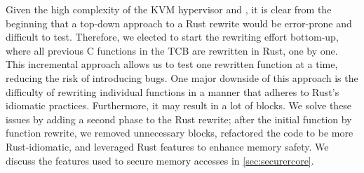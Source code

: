 Given the high complexity of the KVM hypervisor and \secore{},
it is clear from the beginning that
a top-down approach to a Rust rewrite would be error-prone and difficult to test.
Therefore, we elected to start the rewriting effort bottom-up,
where all previous C functions in the TCB are rewritten in Rust, one by one.
This incremental approach allows us to test one rewritten function at a time,
reducing the risk of introducing bugs.
One major downside of this approach is the difficulty of rewriting individual
functions in a manner that adheres to Rust's idiomatic practices.
Furthermore, it may result in a lot of  blocks.
We solve these issues by adding a second phase to the Rust rewrite;
after the initial function by function rewrite, we removed unnecessary
 blocks, refactored the code to be more Rust-idiomatic,
and leveraged Rust features to enhance \rustcore{} memory safety.
We discuss the features used to secure \rustcore{} memory accesses in
\autoref{sec:securercore}.

